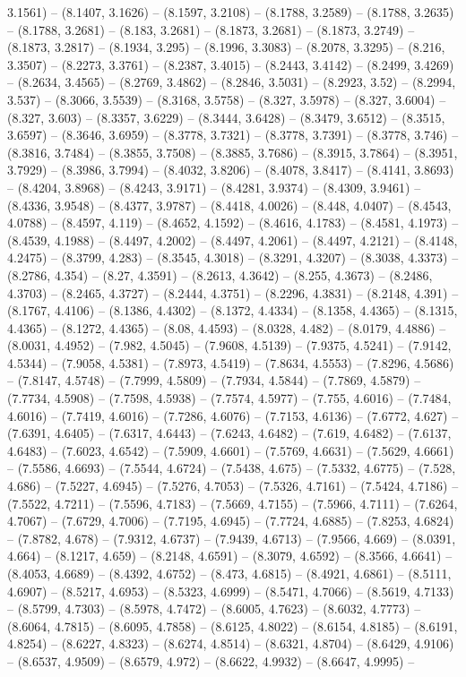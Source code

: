 3.1561) -- (8.1407, 3.1626) -- (8.1597, 3.2108) -- (8.1788, 3.2589) -- (8.1788, 3.2635) -- (8.1788, 3.2681) -- (8.183, 3.2681) -- (8.1873, 3.2681) -- (8.1873, 3.2749) -- (8.1873, 3.2817) -- (8.1934, 3.295) -- (8.1996, 3.3083) -- (8.2078, 3.3295) -- (8.216, 3.3507) -- (8.2273, 3.3761) -- (8.2387, 3.4015) -- (8.2443, 3.4142) -- (8.2499, 3.4269) -- (8.2634, 3.4565) -- (8.2769, 3.4862) -- (8.2846, 3.5031) -- (8.2923, 3.52) -- (8.2994, 3.537) -- (8.3066, 3.5539) -- (8.3168, 3.5758) -- (8.327, 3.5978) -- (8.327, 3.6004) -- (8.327, 3.603) -- (8.3357, 3.6229) -- (8.3444, 3.6428) -- (8.3479, 3.6512) -- (8.3515, 3.6597) -- (8.3646, 3.6959) -- (8.3778, 3.7321) -- (8.3778, 3.7391) -- (8.3778, 3.746) -- (8.3816, 3.7484) -- (8.3855, 3.7508) -- (8.3885, 3.7686) -- (8.3915, 3.7864) -- (8.3951, 3.7929) -- (8.3986, 3.7994) -- (8.4032, 3.8206) -- (8.4078, 3.8417) -- (8.4141, 3.8693) -- (8.4204, 3.8968) -- (8.4243, 3.9171) -- (8.4281, 3.9374) -- (8.4309, 3.9461) -- (8.4336, 3.9548) -- (8.4377, 3.9787) -- (8.4418, 4.0026) -- (8.448, 4.0407) -- (8.4543, 4.0788) -- (8.4597, 4.119) -- (8.4652, 4.1592) -- (8.4616, 4.1783) -- (8.4581, 4.1973) -- (8.4539, 4.1988) -- (8.4497, 4.2002) -- (8.4497, 4.2061) -- (8.4497, 4.2121) -- (8.4148, 4.2475) -- (8.3799, 4.283) -- (8.3545, 4.3018) -- (8.3291, 4.3207) -- (8.3038, 4.3373) -- (8.2786, 4.354) -- (8.27, 4.3591) -- (8.2613, 4.3642) -- (8.255, 4.3673) -- (8.2486, 4.3703) -- (8.2465, 4.3727) -- (8.2444, 4.3751) -- (8.2296, 4.3831) -- (8.2148, 4.391) -- (8.1767, 4.4106) -- (8.1386, 4.4302) -- (8.1372, 4.4334) -- (8.1358, 4.4365) -- (8.1315, 4.4365) -- (8.1272, 4.4365) -- (8.08, 4.4593) -- (8.0328, 4.482) -- (8.0179, 4.4886) -- (8.0031, 4.4952) -- (7.982, 4.5045) -- (7.9608, 4.5139) -- (7.9375, 4.5241) -- (7.9142, 4.5344) -- (7.9058, 4.5381) -- (7.8973, 4.5419) -- (7.8634, 4.5553) -- (7.8296, 4.5686) -- (7.8147, 4.5748) -- (7.7999, 4.5809) -- (7.7934, 4.5844) -- (7.7869, 4.5879) -- (7.7734, 4.5908) -- (7.7598, 4.5938) -- (7.7574, 4.5977) -- (7.755, 4.6016) -- (7.7484, 4.6016) -- (7.7419, 4.6016) -- (7.7286, 4.6076) -- (7.7153, 4.6136) -- (7.6772, 4.627) -- (7.6391, 4.6405) -- (7.6317, 4.6443) -- (7.6243, 4.6482) -- (7.619, 4.6482) -- (7.6137, 4.6483) -- (7.6023, 4.6542) -- (7.5909, 4.6601) -- (7.5769, 4.6631) -- (7.5629, 4.6661) -- (7.5586, 4.6693) -- (7.5544, 4.6724) -- (7.5438, 4.675) -- (7.5332, 4.6775) -- (7.528, 4.686) -- (7.5227, 4.6945) -- (7.5276, 4.7053) -- (7.5326, 4.7161) -- (7.5424, 4.7186) -- (7.5522, 4.7211) -- (7.5596, 4.7183) -- (7.5669, 4.7155) -- (7.5966, 4.7111) -- (7.6264, 4.7067) -- (7.6729, 4.7006) -- (7.7195, 4.6945) -- (7.7724, 4.6885) -- (7.8253, 4.6824) -- (7.8782, 4.678) -- (7.9312, 4.6737) -- (7.9439, 4.6713) -- (7.9566, 4.669) -- (8.0391, 4.664) -- (8.1217, 4.659) -- (8.2148, 4.6591) -- (8.3079, 4.6592) -- (8.3566, 4.6641) -- (8.4053, 4.6689) -- (8.4392, 4.6752) -- (8.473, 4.6815) -- (8.4921, 4.6861) -- (8.5111, 4.6907) -- (8.5217, 4.6953) -- (8.5323, 4.6999) -- (8.5471, 4.7066) -- (8.5619, 4.7133) -- (8.5799, 4.7303) -- (8.5978, 4.7472) -- (8.6005, 4.7623) -- (8.6032, 4.7773) -- (8.6064, 4.7815) -- (8.6095, 4.7858) -- (8.6125, 4.8022) -- (8.6154, 4.8185) -- (8.6191, 4.8254) -- (8.6227, 4.8323) -- (8.6274, 4.8514) -- (8.6321, 4.8704) -- (8.6429, 4.9106) -- (8.6537, 4.9509) -- (8.6579, 4.972) -- (8.6622, 4.9932) -- (8.6647, 4.9995) -- 